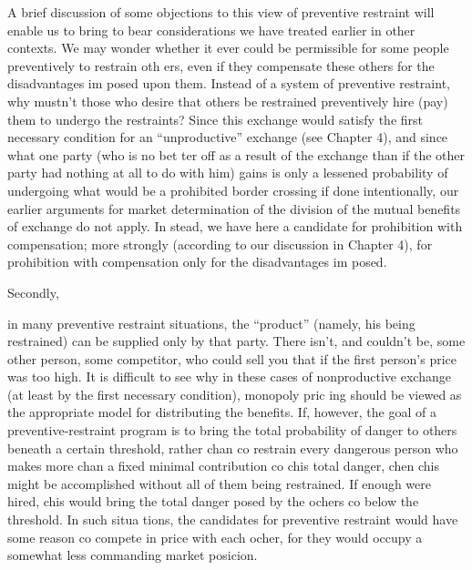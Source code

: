\documentclass[11pt,openany]{book}
\begin{document}
A brief discussion of some objections to this view of preventive restraint will enable us to bring to bear considerations we have treated earlier in other contexts. We may wonder whether it ever could be permissible for some people preventively to restrain oth ers, even if they compensate these others for the disadvantages im posed upon them. Instead of a system of preventive restraint, why mustn't those who desire that others be restrained preventively hire (pay) them to undergo the restraints? Since this exchange would satisfy the first necessary condition for an ``unproductive'' exchange (see Chapter 4), and since what one party (who is no bet ter off as a result of the exchange than if the other party had nothing at all to do with him) gains is only a lessened probability of undergoing what would be a prohibited border crossing if done intentionally, our earlier arguments for market determination of the division of the mutual benefits of exchange do not apply. In stead, we have here a candidate for prohibition with compensation; more strongly (according to our discussion in Chapter 4), for prohibition with compensation only for the disadvantages im posed. 

Secondly, 

in many preventive restraint situations, the ``product'' (namely, his being restrained) can be supplied only by that party. There isn't, and couldn't be, some other person, some competitor, who could sell you that if the first person's price was too high. It is difficult to see why in these cases of nonproductive exchange (at least by the first necessary condition), monopoly pric ing should be viewed as the appropriate model for distributing the benefits. If, however, the goal of a preventive-restraint program is to bring the total probability of danger to others beneath a certain threshold, rather chan co restrain every dangerous person who makes more chan a fixed minimal contribution co chis total danger, chen chis might be accomplished without all of them being restrained. If enough were hired, chis would bring the total danger posed by the ochers co below the threshold. In such situa tions, the candidates for preventive restraint would have some reason co compete in price with each ocher, for they would occupy a somewhat less commanding market posicion. 
\end{document}
